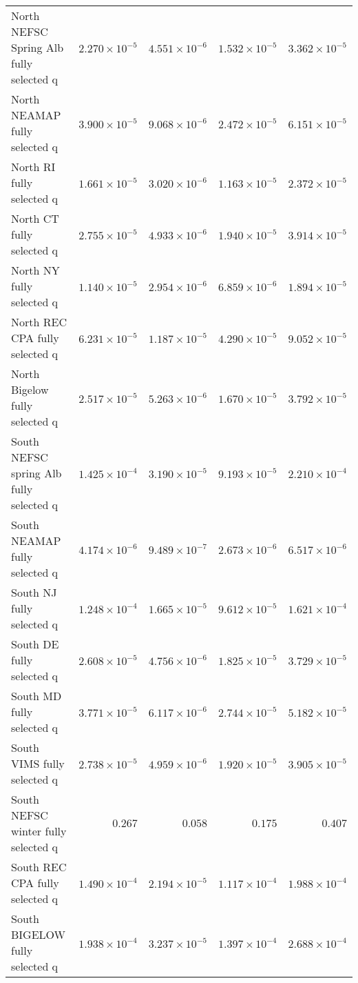 \documentclass[
]{article}
\begin{document}
\begin{landscape}
\begin{longtable}[t]{lrrrr}
\addlinespace
North NEFSC Spring Alb fully selected q & $2.270\times 10^{-5}$ & $4.551\times 10^{-6}$ & $1.532\times 10^{-5}$ & $3.362\times 10^{-5}$\\
North NEAMAP fully selected q & $3.900\times 10^{-5}$ & $9.068\times 10^{-6}$ & $2.472\times 10^{-5}$ & $6.151\times 10^{-5}$\\
North RI fully selected q & $1.661\times 10^{-5}$ & $3.020\times 10^{-6}$ & $1.163\times 10^{-5}$ & $2.372\times 10^{-5}$\\
North CT fully selected q & $2.755\times 10^{-5}$ & $4.933\times 10^{-6}$ & $1.940\times 10^{-5}$ & $3.914\times 10^{-5}$\\
North NY fully selected q & $1.140\times 10^{-5}$ & $2.954\times 10^{-6}$ & $6.859\times 10^{-6}$ & $1.894\times 10^{-5}$\\
\addlinespace
North REC CPA fully selected q & $6.231\times 10^{-5}$ & $1.187\times 10^{-5}$ & $4.290\times 10^{-5}$ & $9.052\times 10^{-5}$\\
North Bigelow fully selected q & $2.517\times 10^{-5}$ & $5.263\times 10^{-6}$ & $1.670\times 10^{-5}$ & $3.792\times 10^{-5}$\\
South NEFSC spring Alb fully selected q & $1.425\times 10^{-4}$ & $3.190\times 10^{-5}$ & $9.193\times 10^{-5}$ & $2.210\times 10^{-4}$\\
South NEAMAP fully selected q & $4.174\times 10^{-6}$ & $9.489\times 10^{-7}$ & $2.673\times 10^{-6}$ & $6.517\times 10^{-6}$\\
South NJ fully selected q & $1.248\times 10^{-4}$ & $1.665\times 10^{-5}$ & $9.612\times 10^{-5}$ & $1.621\times 10^{-4}$\\
\addlinespace
South DE fully selected q & $2.608\times 10^{-5}$ & $4.756\times 10^{-6}$ & $1.825\times 10^{-5}$ & $3.729\times 10^{-5}$\\
South MD fully selected q & $3.771\times 10^{-5}$ & $6.117\times 10^{-6}$ & $2.744\times 10^{-5}$ & $5.182\times 10^{-5}$\\
South VIMS fully selected q & $2.738\times 10^{-5}$ & $4.959\times 10^{-6}$ & $1.920\times 10^{-5}$ & $3.905\times 10^{-5}$\\
South NEFSC winter fully selected q & $0.267$ & $0.058$ & $0.175$ & $0.407$\\
South REC CPA fully selected q & $1.490\times 10^{-4}$ & $2.194\times 10^{-5}$ & $1.117\times 10^{-4}$ & $1.988\times 10^{-4}$\\
\addlinespace
South BIGELOW fully selected q & $1.938\times 10^{-4}$ & $3.237\times 10^{-5}$ & $1.397\times 10^{-4}$ & $2.688\times 10^{-4}$\\

\end{longtable}
\end{landscape}
\end{document}
